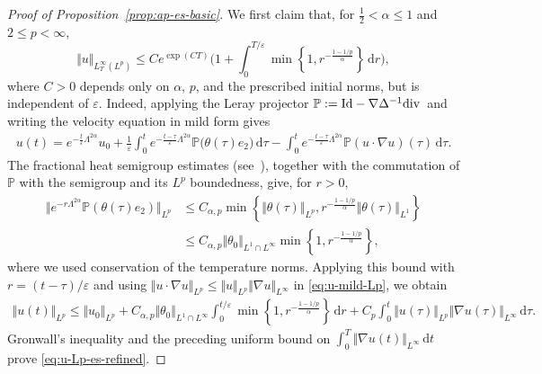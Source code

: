 \documentclass[reqno,11pt,a4paper]{amsart}
\newcommand{\dd}{\mathrm{d}}
\renewcommand{\div}{{\rm div\,}}
\begin{document}
\begin{proof}[Proof of Proposition~\ref{prop:ap-es-basic}]
We first claim that, for $\frac12<\alpha\leq1$
and $2\leq p<\infty$,
\begin{equation}\label{eq:u-Lp-es-refined}
  \Vert u\Vert _{L^\infty_T(L^p)}
  \leq
  Ce^{\exp(CT)}
  \bigg(
    1+\int_0^{T/\varepsilon}
    \min\left\{1,r^{-\frac{1-1/p}{\alpha}}\right\}\,\dd r
  \bigg),
\end{equation}
where $C>0$ depends only on $\alpha$, $p$,
and the prescribed initial norms,
but is independent of $\varepsilon$.
Indeed, applying the Leray projector
$\mathbb P:=\mathrm{Id}-\nabla\Delta^{-1}\div$
and writing the velocity equation in mild form gives
\begin{equation}\label{eq:u-mild-Lp}
\begin{aligned}
  u(t)
  ={} e^{-\frac{t}{\varepsilon}\Lambda^{2\alpha}}u_0
  +\frac1\varepsilon\int_0^t
    e^{-\frac{t-\tau}{\varepsilon}\Lambda^{2\alpha}}
    \mathbb P\bigl(\theta(\tau)e_2\bigr)\,\dd\tau
    -\int_0^t
    e^{-\frac{t-\tau}{\varepsilon}\Lambda^{2\alpha}}
    \mathbb P(u\cdot\nabla u)(\tau)\,\dd\tau.
\end{aligned}
\end{equation}
The fractional heat semigroup estimates
(see~\cite{MYZ08}), together with the commutation
of $\mathbb P$ with the semigroup
and its $L^p$ boundedness, give, for $r>0$,
\begin{align*}
  \bigl\Vert e^{-r\Lambda^{2\alpha}}
    \mathbb P(\theta(\tau)e_2)\bigr\Vert _{L^p}
  &\leq C_{\alpha,p}
  \min\left\{
    \Vert \theta(\tau)\Vert _{L^p},
    r^{-\frac{1-1/p}{\alpha}}\Vert \theta(\tau)\Vert _{L^1}
  \right\}
  \\
  &\leq C_{\alpha,p}\Vert \theta_0\Vert _{L^1\cap L^\infty}
    \min\left\{1,r^{-\frac{1-1/p}{\alpha}}\right\},
\end{align*}
where we used conservation of the temperature norms.
Applying this bound with $r=(t-\tau)/\varepsilon$
and using
$\Vert u\cdot\nabla u\Vert _{L^p}
\leq\Vert u\Vert _{L^p}\Vert \nabla u\Vert _{L^\infty}$
in \eqref{eq:u-mild-Lp}, we obtain
\begin{align*}
  \Vert u(t)\Vert _{L^p}
  \leq {}
  \Vert u_0\Vert _{L^p}
  +C_{\alpha,p}\Vert \theta_0\Vert _{L^1\cap L^\infty}
  \int_0^{t/\varepsilon}
    \min\left\{1,r^{-\frac{1-1/p}{\alpha}}\right\}\,\dd r
    +C_p\int_0^t
    \Vert u(\tau)\Vert _{L^p}
    \Vert \nabla u(\tau)\Vert _{L^\infty}\,\dd\tau.
\end{align*}
Gronwall's inequality and the preceding uniform bound on
$\int_0^T\Vert \nabla u(t)\Vert _{L^\infty}\,\dd t$
prove \eqref{eq:u-Lp-es-refined}.


\end{proof}
\end{document}
